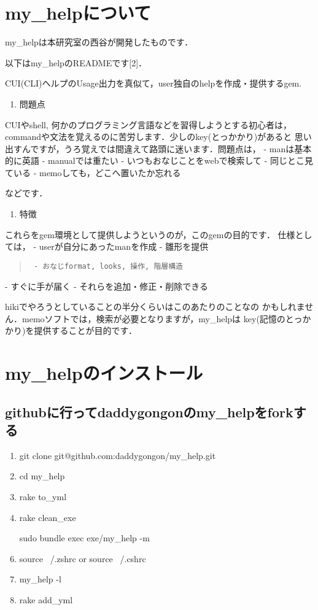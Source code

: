 \section{my\_helpについて}
my\_helpは本研究室の西谷が開発したものです．

以下はmy\_helpのREADMEです[2]．

CUI(CLI)ヘルプのUsage出力を真似て，user独自のhelpを作成・提供するgem.
\begin{enumerate}
\item 問題点
\end{enumerate}
CUIやshell, 何かのプログラミング言語などを習得しようとする初心者は，
commandや文法を覚えるのに苦労します．少しのkey(とっかかり)があると
思い出すんですが，うろ覚えでは間違えて路頭に迷います．問題点は，
- manは基本的に英語
- manualでは重たい
- いつもおなじことをwebで検索して
- 同じとこ見ている
- memoしても，どこへ置いたか忘れる

などです．
\begin{enumerate}
\item 特徴
\end{enumerate}
これらをgem環境として提供しようというのが，このgemの目的です．
仕様としては，
- userが自分にあったmanを作成
- 雛形を提供
\begin{quote}\begin{verbatim}
 - おなじformat, looks, 操作, 階層構造
\end{verbatim}\end{quote}
- すぐに手が届く
- それらを追加・修正・削除できる

hikiでやろうとしていることの半分くらいはこのあたりのことなの
かもしれません．memoソフトでは，検索が必要となりますが，my\_helpは
key(記憶のとっかかり)を提供することが目的です．

\section{my\_helpのインストール}
\subsection{githubに行ってdaddygongonのmy\_helpをforkする}\begin{enumerate}
\item git clone git@github.com:daddygongon/my\_help.git
\item cd my\_help
\item rake to\_yml
\item rake clean\_exe
\item [sudo] bundle exec exe/my\_help -m
\item source ~/.zshrc or source ~/.cshrc
\item my\_help -l
\item rake add\_yml
\end{enumerate}
